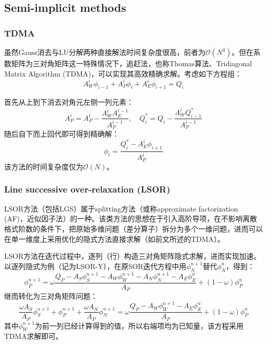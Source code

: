 \documentclass[11pt]{article}
\begin{document}
\subsection{Semi-implicit methods}

\subsubsection{TDMA}
虽然Gauss消去与LU分解两种直接解法时间复杂度很高，前者为$\mathcal{O}(N^3)$。但在系数矩阵为三对角矩阵这一特殊情况下，追赶法，也称Thomas算法、Tridiagonal Matrix Algorithm (TDMA)，可以实现其高效精确求解。考虑如下方程组：
\begin{equation}
	A_W^i\phi_{i-1}+A_P^i\phi_i+A_E^i\phi_{i+1}=Q_i
\end{equation}

首先从上到下消去对角元左侧一列元素：
\begin{equation}
	A_P^i=A_P^i-\frac{A_W^iA_E^{i-1}}{A_P^{i-1}},\quad Q_i^*=Q_i-\frac{A_W^iQ_{i-1}^*}{A_P^{i-1}}
\end{equation}
随后自下而上回代即可得到精确解：
\begin{equation}
	\phi_i=\frac{Q_i^*-A_E^i\phi_{i+1}}{A_P^i}
\end{equation}
该方法的时间复杂度仅为$\mathcal{O}(N)$。

\subsubsection{Line successive over-relaxation (LSOR)}
LSOR方法（包括LGS）属于splitting方法（或称approximate factorization (AF)，近似因子法）的一种。该类方法的思想在于引入高阶导项，在不影响离散格式阶数的条件下，把原始多维问题（差分算子）拆分为多个一维问题，进而可以在单一维度上采用优化的隐式方法直接求解（如前文所述的TDMA）。

LSOR方法在迭代过程中，逐列（行）构造三对角矩阵隐式求解，进而实现加速。以逐列隐式为例（记为LSOR-Y），在原SOR迭代方程中用$\phi_N^{n+1}$替代$\phi_N^n$，得到：
\begin{equation}
	\phi_P^{n+1}=\omega\frac{Q_P-A_S\phi_S^{n+1}-A_W\phi_W^{n+1}-A_N\phi_N^{n+1}-A_E\phi_E^n}{A_P}+(1-\omega)\phi_P^n
\end{equation}
继而转化为三对角矩阵问题：
\begin{equation}
	\frac{\omega A_S}{A_P}\phi_S^{n+1}+\phi_P^{n+1}+\frac{\omega A_N}{A_P}\phi_N^{n+1}=\omega\frac{Q_P-A_W\phi_W^{n+1}-A_E\phi_E^n}{A_P}+(1-\omega)\phi_P^n
\end{equation}
其中$\phi_W^{n+1}$为前一列已经计算得到的值，所以右端项均为已知量，该方程采用TDMA求解即可。
\end{document}
